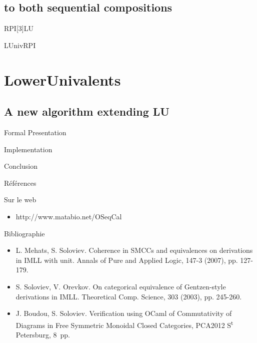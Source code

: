 \documentclass[compress]{beamer}
\newenvironment{subpart}[1]
{ \begin{block}{#1}
  \begin{itemize}
}{
  \end{itemize}
  \end{block}
}
\begin{document}
\subsection{to both sequential compositions}

\begin{frame}{RPI[3]LU}
\end{frame}

\begin{frame}{LUnivRPI}
\end{frame}

\section{LowerUnivalents}
\subsection{A new algorithm extending LU}

\begin{frame}{Formal Presentation}
\end{frame}

\begin{frame}{Implementation}
\end{frame}


\appendix

\begin{frame}{Conclusion}
\centering

\end{frame}

\begin{frame}{Références}

\begin{subpart}{Sur le web}
\item http://www.matabio.net/OSeqCal
\end{subpart}

\begin{subpart}{Bibliographie}
\item L. Mehats, S. Soloviev. Coherence in SMCCs and equivalences on derivations in IMLL with unit. Annals of Pure and Applied Logic, 147-3 (2007), pp. 127-179.
\item S. Soloviev, V. Orevkov. On categorical equivalence of Gentzen-style derivations in IMLL. Theoretical Comp. Science, 303 (2003), pp. 245-260.
\item J. Boudou, S. Soloviev. Verification using OCaml of Commutativity of
Diagrams in Free Symmetric Monoidal Closed Categories, PCA2012
S\textsuperscript{t} Petersburg, 8~pp.
\end{subpart}

\end{frame}
\end{document}
